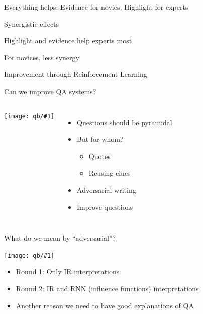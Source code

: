 \documentclass[xcolor=dvipsnames]{beamer}
\newcommand{\fsi}[2]{
\begin{frame}[plain]
\vspace*{-1pt}
\makebox[\linewidth]{\texttt{[image: \#1]}}
\begin{center}
#2
\end{center}
\end{frame}
}
\newcommand{\gfxq}[2]{
\begin{center}
	\texttt{[image: qb/\#1]}
\end{center}
}
\begin{document}
\fsi{qb/augment/coefs_0}{Everything helps: Evidence for novies,
  Highlight for experts}
\fsi{qb/augment/coefs_1}{Synergistic effects}
\fsi{qb/augment/coefs_2}{Highlight and evidence help experts most}
\fsi{qb/augment/coefs_3}{For novices, less synergy}

\begin{frame}{Improvement through Reinforcement Learning}

  \only<1>{\gfxq{rl_centaur_2}{.9}}
  \only<2>{\gfxq{rl_centaur_3}{.9}}
  \only<3>{\gfxq{rl_centaur_4}{.9}}
  \only<4>{\gfxq{rl_centaur_5}{.9}}
  \only<5>{\gfxq{rl_centaur_6}{.9}}

\end{frame}

\begin{frame}{Can we improve QA systems?}

\begin{columns}
     \gfxq{trick/pyramid}{.9}
     \begin{itemize}
       \item Questions should be pyramidal
       \item But for whom?
         \begin{itemize}
           \item Quotes
           \item Reusing clues
         \end{itemize}
         \item Adversarial writing
         \item Improve questions
     \end{itemize}
\end{columns}
\end{frame}

\begin{frame}{What do we mean by ``adversarial''?}

  \gfxq{trick/flow_chart_horizontal_label}{1.0}

  \begin{itemize}
    \item Round 1: Only IR interpretations
    \item Round 2: IR and RNN (influence functions) interpretations
      \pause
    \item Another reason we need to have good explanations of QA
  \end{itemize}

\end{frame}
\end{document}

